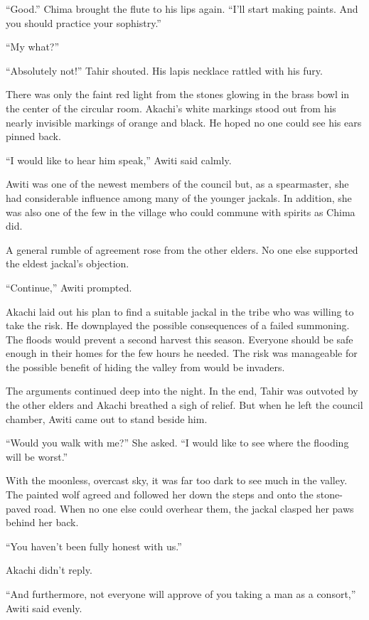 ``Good.'' Chima brought the flute to his lips again. ``I'll start making paints. And you should practice your sophistry.''

``My what?''

\secdiv

\noindent ``Absolutely not!'' Tahir shouted. His lapis necklace rattled with his fury.

There was only the faint red light from the stones glowing in the brass bowl in the center of the circular room. Akachi's white markings stood out from his nearly invisible markings of orange and black. He hoped no one could see his ears pinned back.

``I would like to hear him speak,'' Awiti said calmly.

Awiti was one of the newest members of the council but, as a spearmaster, she had considerable influence among many of the younger jackals. In addition, she was also one of the few in the village who could commune with spirits as Chima did.

A general rumble of agreement rose from the other elders. No one else supported the eldest jackal's objection.

``Continue,'' Awiti prompted.

Akachi laid out his plan to find a suitable jackal in the tribe who was willing to take the risk. He downplayed the possible consequences of a failed summoning. The floods would prevent a second harvest this season. Everyone should be safe enough in their homes for the few hours he needed. The risk was manageable for the possible benefit of hiding the valley from would be invaders.

The arguments continued deep into the night. In the end, Tahir was outvoted by the other elders and Akachi breathed a sigh of relief. But when he left the council chamber, Awiti came out to stand beside him.

``Would you walk with me?'' She asked. ``I would like to see where the flooding will be worst.''

With the moonless, overcast sky, it was far too dark to see much in the valley. The painted wolf agreed and followed her down the steps and onto the stone-paved road. When no one else could overhear them, the jackal clasped her paws behind her back.

``You haven't been fully honest with us.''

Akachi didn't reply.

``And furthermore, not everyone will approve of you taking a man as a consort,'' Awiti said evenly.

